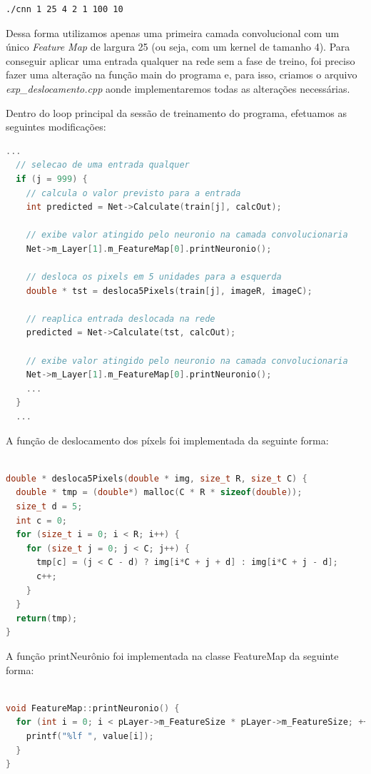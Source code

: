 \documentclass[12pt, a4paper, brazil, portuguese]{article}
\begin{document}
\begin{verbatim}
./cnn 1 25 4 2 1 100 10
\end{verbatim}

Dessa forma utilizamos apenas uma primeira camada convolucional com um único \emph{Feature Map} de
largura 25 (ou seja, com um kernel de tamanho 4). Para conseguir aplicar uma entrada qualquer na
rede sem a fase de treino, foi preciso fazer uma alteração na função main do programa e, para isso,
criamos o arquivo \emph{exp\_deslocamento.cpp} aonde implementaremos todas as alterações necessárias.

Dentro do loop principal da sessão de treinamento do programa, efetuamos as seguintes modificações:

\begin{lstlisting}[language=c]
  ...
  // selecao de uma entrada qualquer
  if (j = 999) {
    // calcula o valor previsto para a entrada
    int predicted = Net->Calculate(train[j], calcOut);

    // exibe valor atingido pelo neuronio na camada convolucionaria
    Net->m_Layer[1].m_FeatureMap[0].printNeuronio();

    // desloca os pixels em 5 unidades para a esquerda
    double * tst = desloca5Pixels(train[j], imageR, imageC);

    // reaplica entrada deslocada na rede
    predicted = Net->Calculate(tst, calcOut);

    // exibe valor atingido pelo neuronio na camada convolucionaria
    Net->m_Layer[1].m_FeatureMap[0].printNeuronio();
    ...
  }
  ...
\end{lstlisting}

A função de deslocamento dos píxels foi implementada da seguinte forma:

\begin{lstlisting}[language=c]

double * desloca5Pixels(double * img, size_t R, size_t C) {
  double * tmp = (double*) malloc(C * R * sizeof(double));
  size_t d = 5;
  int c = 0;
  for (size_t i = 0; i < R; i++) {
    for (size_t j = 0; j < C; j++) {
      tmp[c] = (j < C - d) ? img[i*C + j + d] : img[i*C + j - d];
      c++;
    }
  }
  return(tmp);
}

\end{lstlisting}

A função printNeurônio foi implementada na classe FeatureMap da seguinte forma:

\begin{lstlisting}[language=c]

void FeatureMap::printNeuronio() {
  for (int i = 0; i < pLayer->m_FeatureSize * pLayer->m_FeatureSize; ++i) {
    printf("%lf ", value[i]);
  }
}

\end{lstlisting}
\end{document}
